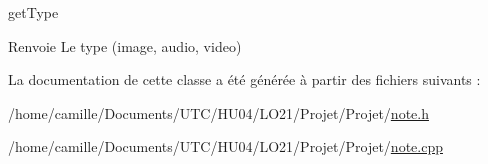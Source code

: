 get\-Type 

\begin{DoxyReturn}{Renvoie}
Le type (image, audio, video) 
\end{DoxyReturn}


La documentation de cette classe a été générée à partir des fichiers suivants \-:\begin{DoxyCompactItemize}
\item 
/home/camille/\-Documents/\-U\-T\-C/\-H\-U04/\-L\-O21/\-Projet/\-Projet/\hyperlink{note_8h}{note.\-h}\item 
/home/camille/\-Documents/\-U\-T\-C/\-H\-U04/\-L\-O21/\-Projet/\-Projet/\hyperlink{note_8cpp}{note.\-cpp}\end{DoxyCompactItemize}
